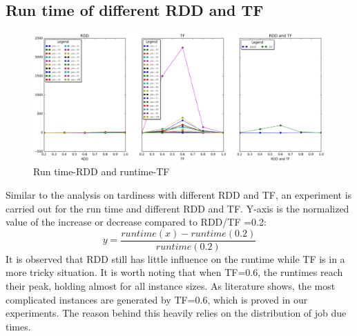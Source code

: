 \documentclass[11pt]{article}
\begin{document}
\subsection{Run time of different RDD and TF}
\begin{figure}[H]
\hspace*{-1cm} 
    \label{fig:runtime} %
    \includegraphics[width=1.2\textwidth]{RDD_TF_runtime.png}
	\caption{Run time-RDD and runtime-TF}
	\label{fig:RDD_TF_runtime}
\end{figure}
Similar to the analysis on tardiness with different RDD and TF, an experiment is carried out for the run time and different RDD and TF. Y-axis is the normalized value of the increase or decrease compared to RDD/TF =0.2:
$$ y= \frac{runtime(x)-runtime(0.2)}{runtime(0.2)}$$
It is observed that RDD still has little influence on the runtime while TF is in a more tricky situation. It is worth noting that when TF=0.6, the runtimes reach their peak, holding almost for all instance sizes.  As literature shows, the most complicated instances are generated by TF=0.6, which is proved in our experiments. The reason behind this heavily relies on the distribution of  job due times.
\end{document}
